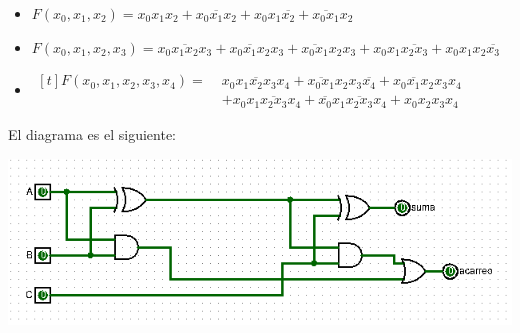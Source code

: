 \documentclass[answers]{exam}
\begin{document}
\begin{questions}
  \begin{itemize}
    \item
          \begin{math}
            F(x_{0}, x_{1}, x_{2}) = x_{0}x_{1}x_{2} + \overline{x_{0}x_{1}x_{2}} +%
            x_{0}x_{1}\overline{x_{2}} + \overline{x_{0}x_{1}}x_{2}%
          \end{math}
    \item
          \begin{math}
            F(x_{0}, x_{1}, x_{2}, x_{3}) = \overline{x_{0}x_{1}x_{2}x_{3}} +%
            \overline{x_{0}x_{1}x_{2}}x_{3} + \overline{x_{0}x_{1}}x_{2}x_{3} +%
            x_{0}x_{1}\overline{x_{2}x_{3}} + x_{0}x_{1}x_{2}\overline{x_{3}}
          \end{math}
    \item
          \begin{math}
            \begin{aligned}[t]
              F(x_{0}, x_{1}, x_{2}, x_{3}, x_{4}) =\;
              &\overline{x_{0}x_{1}x_{2}x_{3}x_{4}} +
              \overline{x_{0}x_{1}}x_{2}x_{3}\overline{x_{4}} +
              x_{0}\overline{x_{1}}x_{2}x_{3}x_{4} \\
              &+ x_{0}x_{1}\overline{x_{2}x_{3}}x_{4}
              + \overline{x_{0}}x_{1}\overline{x_{2}x_{3}}x_{4}
              + x_{0}x_{2}x_{3}x_{4}
            \end{aligned}
          \end{math}
  \end{itemize}

  \begin{solution}
    El diagrama es el siguiente:
    \begin{center}
      \includegraphics[width=\linewidth]{ejercicio6}
    \end{center}
  \end{solution}


\end{questions}
\end{document}
